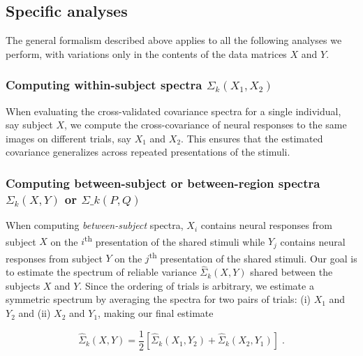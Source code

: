 \documentclass[10pt]{article}
\begin{document}
\subsection{Specific analyses}\label{specific-analyses}

The general formalism described above applies to all the following analyses we perform, with variations only in the contents of the data matrices \(X\) and \(Y\).

\subsubsection{\texorpdfstring{Computing within-subject spectra \(\Sigma_k(X_1, X_2)\)}{Computing within-subject spectra \textbackslash Sigma\_k(X\_1, X\_2)}}\label{computing-within-subject-spectra-sigma_kx_1-x_2}

When evaluating the cross-validated covariance spectra for a single individual, say subject \(X\), we compute the cross-covariance of neural responses to the same images on different trials, say \(X_1\) and \(X_2\). This ensures that the estimated covariance generalizes across repeated presentations of the stimuli.

\subsubsection{\texorpdfstring{Computing between-subject or between-region spectra \(\Sigma_k(X, Y)\) or \(\Sigma\_k(P, Q)\)}{Computing between-subject or between-region spectra \textbackslash Sigma\_k(X, Y) or \textbackslash Sigma\textbackslash\_k(P, Q)}}\label{computing-between-subject-or-between-region-spectra-sigma_kx-y-or-sigma_kp-q}

When computing \emph{between-subject} spectra, \(X_i\) contains neural responses from subject \(X\) on the \(i\)\textsuperscript{th} presentation of the shared stimuli while \(Y_j\) contains neural responses from subject \(Y\) on the \(j\)\textsuperscript{th} presentation of the shared stimuli. Our goal is to estimate the spectrum of reliable variance \(\hat{\Sigma}_k(X, Y)\) shared between the subjects \(X\) and \(Y\). Since the ordering of trials is arbitrary, we estimate a symmetric spectrum by averaging the spectra for two pairs of trials: (i) \(X_1\) and \(Y_2\) and (ii) \(X_2\) and \(Y_1\), making our final estimate

\[
    \hat{\Sigma}_k(X, Y) = \frac{1}{2}\left[\hat{\Sigma}_k(X_1, Y_2) + \hat{\Sigma}_k(X_2, Y_1)\right]\;.
\]
\end{document}
